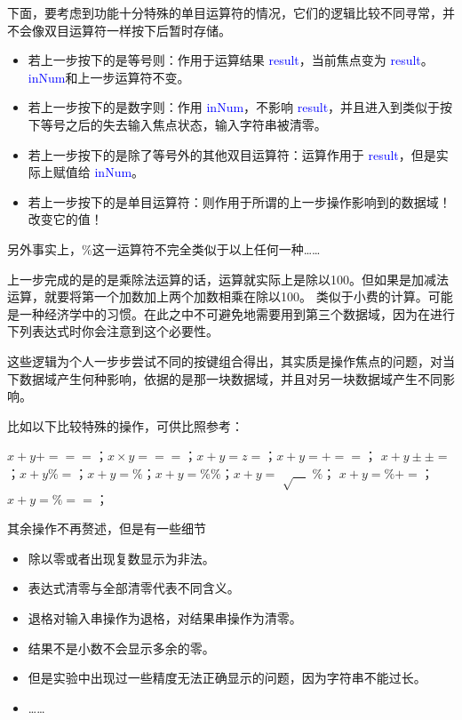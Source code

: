 \documentclass{ctexart}
\begin{document}
下面，要考虑到功能十分特殊的单目运算符的情况，它们的逻辑比较不同寻常，并不会像双目运算符一样按下后暂时存储。
\begin{itemize}
    \item 若上一步按下的是等号则：作用于运算结果\textcolor{blue}{ result}，当前焦点变为\textcolor{blue}{ result}。\textcolor{blue}{ inNum}和上一步运算符不变。
    \item 若上一步按下的是数字则：作用\textcolor{blue}{ inNum}，不影响\textcolor{blue}{ result}，并且进入到类似于按下等号之后的失去输入焦点状态，输入字符串被清零。
    \item 若上一步按下的是除了等号外的其他双目运算符：运算作用于\textcolor{blue}{ result}，但是实际上赋值给\textcolor{blue}{ inNum}。
    \item 若上一步按下的是单目运算符：则作用于所谓的上一步操作影响到的数据域！改变它的值！
\end{itemize}
{\heiti {} 另外事实上，{\%}这一运算符不完全类似于以上任何一种……}

上一步完成的是的是乘除法运算的话，运算就实际上是除以100。但如果是加减法运算，就要将第一个加数加上两个加数相乘在除以100。
类似于小费的计算。可能是一种经济学中的习惯。在此之中不可避免地需要用到第三个数据域，因为在进行下列表达式时你会注意到这个必要性。

这些逻辑为个人一步步尝试不同的按键组合得出，其实质是操作焦点的问题，对当下数据域产生何种影响，依据的是那一块数据域，并且对另一块数据域产生不同影响。

比如以下比较特殊的操作，可供比照参考：

$x+y+===$；$x\times y===$；$x+y=z=$；$x+y=+==$；
$x+y\pm\pm=$；$x+y\%=$；$x+y=\%$；$x+y=\%\%$；$x+y=$ $\sqrt{\quad}$ $\%$；
$x+y=\%+=$；$x+y=\%==$；


{\heiti {} 其余操作不再赘述，但是有一些细节}

\begin{itemize}
    \item 除以零或者出现复数显示为非法。
    \item 表达式清零与全部清零代表不同含义。
    \item 退格对输入串操作为退格，对结果串操作为清零。
    \item 结果不是小数不会显示多余的零。
    \item 但是实验中出现过一些精度无法正确显示的问题，因为字符串不能过长。
    \item ……
\end{itemize}
\end{document}
